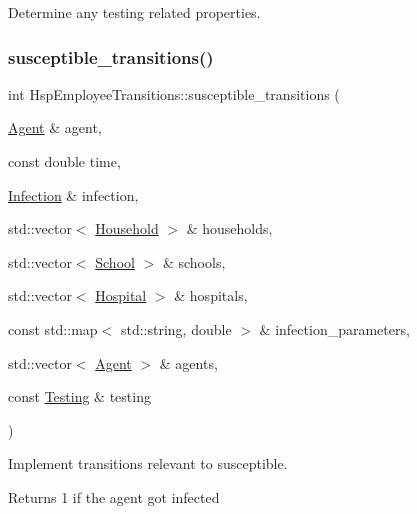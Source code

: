 Determine any testing related properties. 

\mbox{\label{classHspEmployeeTransitions_a9a514d0c8b5212bd9f6ea05fc25d2498}} 
\subsubsection{\texorpdfstring{susceptible\+\_\+transitions()}{susceptible\_transitions()}}
{\footnotesize\ttfamily int Hsp\+Employee\+Transitions\+::susceptible\+\_\+transitions (\begin{DoxyParamCaption}\item[{\hyperlink{classAgent}{Agent} \&}]{agent,  }\item[{const double}]{time,  }\item[{\hyperlink{classInfection}{Infection} \&}]{infection,  }\item[{std\+::vector$<$ \hyperlink{classHousehold}{Household} $>$ \&}]{households,  }\item[{std\+::vector$<$ \hyperlink{classSchool}{School} $>$ \&}]{schools,  }\item[{std\+::vector$<$ \hyperlink{classHospital}{Hospital} $>$ \&}]{hospitals,  }\item[{const std\+::map$<$ std\+::string, double $>$ \&}]{infection\+\_\+parameters,  }\item[{std\+::vector$<$ \hyperlink{classAgent}{Agent} $>$ \&}]{agents,  }\item[{const \hyperlink{classTesting}{Testing} \&}]{testing }\end{DoxyParamCaption})}



Implement transitions relevant to susceptible. 

Returns 1 if the agent got infected \mbox{\label{classHspEmployeeTransitions_a5620e353a3d778cb12f3259addaca7d5}} 
